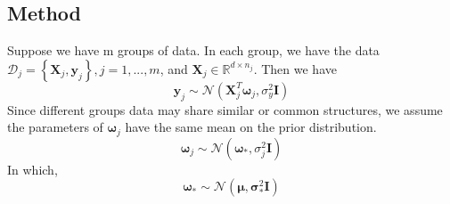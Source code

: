 \documentclass[paper=a4, fontsize=11pt]{scrartcl}
\numberwithin{equation}{section}		%
\numberwithin{figure}{section}			%
\numberwithin{table}{section}				%
\begin{document}
\subsection{Method}
Suppose we have m groups of data. In each group, we have the data $ \mathbf{\mathcal{D}}_{j} = \left\{\textbf{X}_{j},\textbf{y}_{j}\right\},j=1,...,m$, and $\textbf{X}_{j}\in\mathbb{R}^{d\times n_{j}}$. Then we have
\begin{equation}
  \mathbf{y}_{j} \sim \mathcal{N}\left(\mathbf{X}_{j}^{T}\mathbf{\omega}_{j},\sigma_{y}^{2}\mathbf{I}\right)
\end{equation}
Since different groups data may share similar or common structures, we assume the parameters of $\mathbf{\omega}_{j}$ have the same mean on the prior distribution.
\begin{equation}
  \mathbf{\omega}_{j} \sim \mathcal{N} \left(\mathbf{\omega}_{\ast},\sigma_{j}^{2}\mathbf{I}\right)
\end{equation}
In which,
\begin{equation}
  \mathbf{\omega}_{\ast} \sim \mathcal{N} \left(\mathbf{\mu},\mathbf{\sigma}_{\ast}^2\mathbf{I}\right)
\end{equation}
\end{document}
